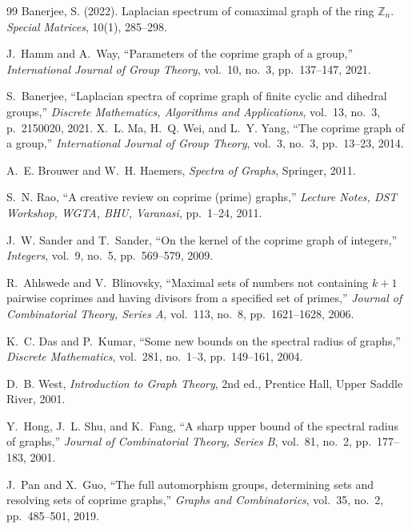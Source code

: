 \documentclass[12pt]{article}
\begin{document}
\begin{thebibliography}{99}
		Banerjee, S. (2022). Laplacian spectrum of comaximal graph of the ring $\mathbb Z_n$. \emph{Special Matrices}, 10(1), 285--298.
		
		J.~Hamm and A.~Way, ``Parameters of the coprime graph of a group,'' \emph{International Journal of Group Theory}, vol.~10, no.~3, pp.~137--147, 2021.
		
		S.~Banerjee, ``Laplacian spectra of coprime graph of finite cyclic and dihedral groups,'' \emph{Discrete Mathematics, Algorithms and Applications}, vol.~13, no.~3, p.~2150020, 2021.
		X.~L. Ma, H.~Q. Wei, and L.~Y. Yang, ``The coprime graph of a group,'' \emph{International Journal of Group Theory}, vol.~3, no.~3, pp.~13--23, 2014.
		
		A.~E. Brouwer and W.~H. Haemers, \emph{Spectra of Graphs}, Springer, 2011.
		
		S.~N. Rao, ``A creative review on coprime (prime) graphs,'' \emph{Lecture Notes, DST Workshop, WGTA, BHU, Varanasi}, pp.~1--24, 2011.
		
		J.~W. Sander and T.~Sander, ``On the kernel of the coprime graph of integers,'' \emph{Integers}, vol.~9, no.~5, pp.~569--579, 2009.
		
		R.~Ahlswede and V.~Blinovsky, ``Maximal sets of numbers not containing $k+1$ pairwise coprimes and having divisors from a specified set of primes,'' \emph{Journal of Combinatorial Theory, Series A}, vol.~113, no.~8, pp.~1621--1628, 2006.
		
		K.~C. Das and P.~Kumar, ``Some new bounds on the spectral radius of graphs,'' \emph{Discrete Mathematics}, vol.~281, no.~1--3, pp.~149--161, 2004.
		
		D.~B. West, \emph{Introduction to Graph Theory}, 2nd ed., Prentice Hall, Upper Saddle River, 2001.
		
		Y.~Hong, J.~L. Shu, and K.~Fang, ``A sharp upper bound of the spectral radius of graphs,'' \emph{Journal of Combinatorial Theory, Series B}, vol.~81, no.~2, pp.~177--183, 2001.
		
		J.~Pan and X.~Guo, ``The full automorphism groups, determining sets and resolving sets of coprime graphs,'' \emph{Graphs and Combinatorics}, vol.~35, no.~2, pp.~485--501, 2019.
		

\end{thebibliography}
\end{document}
